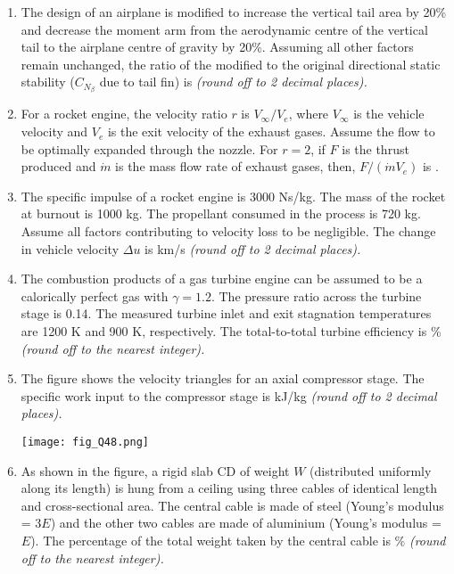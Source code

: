 \documentclass[12pt]{article}
\begin{document}
\begin{enumerate}[label=Q.\arabic*, start=26]
	\item The design of an airplane is modified to increase the vertical tail area by 20\% and decrease the moment arm from the aerodynamic centre of the vertical tail to the airplane centre of gravity by 20\%. Assuming all other factors remain unchanged, the ratio of the modified to the original directional static stability ($C_{N_\beta}$ due to tail fin) is \underline{\hspace{2cm}} \textit{(round off to 2 decimal places).}\\

	\item For a rocket engine, the velocity ratio $r$ is $V_\infty/V_e$, where $V_\infty$ is the vehicle velocity and $V_e$ is the exit velocity of the exhaust gases. Assume the flow to be optimally expanded through the nozzle. For $r = 2$, if $F$ is the thrust produced and $\dot{m}$ is the mass flow rate of exhaust gases, then, $F/(\dot{m}V_e)$ is \underline{\hspace{2cm}}.\\

	\item The specific impulse of a rocket engine is 3000 Ns/kg. The mass of the rocket at burnout is 1000 kg. The propellant consumed in the process is 720 kg. Assume all factors contributing to velocity loss to be negligible. The change in vehicle velocity $\Delta u$ is \underline{\hspace{2cm}} km/s \textit{(round off to 2 decimal places).}\\

	\item The combustion products of a gas turbine engine can be assumed to be a calorically perfect gas with $\gamma = 1.2$. The pressure ratio across the turbine stage is 0.14. The measured turbine inlet and exit stagnation temperatures are 1200 K and 900 K, respectively. The total-to-total turbine efficiency is \underline{\hspace{2cm}} \% \textit{(round off to the nearest integer).}\\
	\item The figure shows the velocity triangles for an axial compressor stage. The specific work input to the compressor stage is \underline{\hspace{2cm}} kJ/kg \textit{(round off to 2 decimal places).}

		\begin{center}
			\texttt{[image: fig\_Q48.png]}
		\end{center}
	\item As shown in the figure, a rigid slab CD of weight $W$ (distributed uniformly along its length) is hung from a ceiling using three cables of identical length and cross-sectional area. The central cable is made of steel (Young’s modulus = $3E$) and the other two cables are made of aluminium (Young’s modulus = $E$). The percentage of the total weight taken by the central cable is \underline{\hspace{2cm}} \% \textit{(round off to the nearest integer).}


\end{enumerate}
\end{document}
